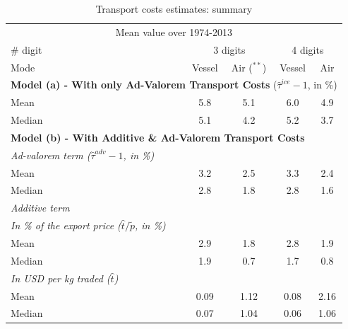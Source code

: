 \documentclass[a4paper,11pt]{article}
\begin{document}
\begin{table}[htbp]
  \centering
  \footnotesize{
  \caption{Transport costs estimates: summary \label{tab:summary_results}}
  \begin{center}
    \begin{tabular}{l|cc|cc}
      \hline \hline
    \multicolumn{5}{c}{Mean value over 1974-2013}   \\
    \# digit & \multicolumn{2}{c}{3 digits} & \multicolumn{2}{c}{4 digits} \\ \hline
    Mode  & Vessel & Air ($^{\ast \ast}$) & Vessel & Air \\ \hline
    \multicolumn{5}{l}{\textbf{Model (a) - With only Ad-Valorem Transport Costs} ($\widehat{\tau}^{ice} -1$, in \%)}  \\ \hline
    Mean  & 5.8 & 5.1 & 6.0 & 4.9 \\
    Median & 5.1 & 4.2 & 5.2 & 3.7 \\ \hline
    \multicolumn{5}{l}{\textbf{Model (b) - With Additive \& Ad-Valorem Transport Costs} } \\ \hline
   \textit{Ad-valorem term ($\widehat{\tau}^{adv}-1$, in \%)} & & & & \\ \hline
    Mean  & 3.2 & 2.5 & 3.3 & 2.4 \\
    Median & 2.8 & 1.8 & 2.8 & 1.6 \\ \hline
    \textit{Additive term }& & & &   \\ \hline
    \textit{In \% of the export price ($\widehat{t}/\widetilde{p}$, in \%)} &&&& \\ \hline
        Mean  & 2.9 & 1.8 & 2.8 & 1.9 \\
    Median & 1.9 & 0.7 & 1.7 & 0.8 \\ \hline
   \textit{In USD per kg traded ($\widehat{t}$)}&&&& \\ \hline
    Mean & 0.09	&1.12	&0.08&	2.16 \\
    Median & 0.07	&1.04	&0.06&	1.06 \\ \hline

\end{tabular}
\end{center}}
\end{table}
\end{document}
